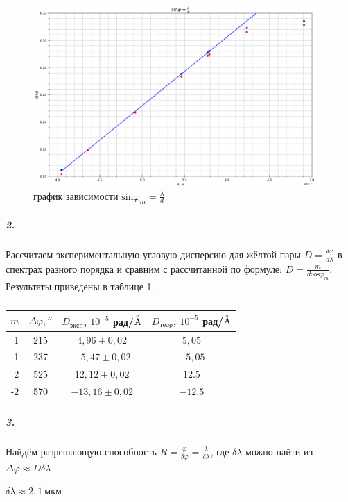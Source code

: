 \documentclass[a4paper,12pt]{article}
\begin{document}
\begin{figure}[!h]
\centering
\includegraphics[width=0.85\linewidth]{graph1'.png}
\caption{график зависимости $\text{sin} \varphi_{m}=\frac{\lambda}{d}$}
\label{fig:mpr}
\end{figure}
\newpage
\subparagraph{2.} Рассчитаем экспериментальную угловую дисперсию для жёлтой пары $D=\frac{d\varphi}{d\lambda}$ в спектрах разного порядка и сравним с рассчитанной по формуле: $D=\frac{m}{d\text{cos}\varphi_{m}}$. Результаты приведены в таблице 1.


\begin{table}[H]
\begin{center}
			\caption{}
			\label{Таблица 2}
			\begin{tabular}{|r|c|c|c|}
				\hline
				$m$  & $ \Delta \varphi , ''$  & $D_{эксп}$,  $ 10^{-5} $ рад/$  \buildrel _{\circ} \over {\mathrm{A}}$   & $D_{теор}$,   $ 10^{-5} $ рад/$  \buildrel _{\circ} \over {\mathrm{A}}$   \\ \hline
				1  &215    & $4,96\pm 0,02$ & $5,05$  \\ \hline
				-1 & 237     &$-5,47\pm 0,02$ & $-5,05$ \\ \hline
				2  & 525    &$12,12\pm0,02$ & $12.5$  \\ \hline
				-2 & 570     &$-13,16\pm 0,02$ & $-12.5$ \\ \hline
			\end{tabular}
   \end{center}
		\end{table}

\subparagraph{3.} Найдём разрешающую способность $R=\frac{\varphi}{\delta \varphi}=\frac{\lambda}{\delta \lambda}$, где $\delta \lambda$ можно найти из $\Delta \varphi \approx D \delta \lambda$

\begin{center}
    $\delta \lambda \approx 2,1 ~ мкм$
\end{center}
\end{document}
